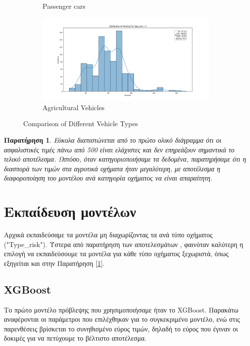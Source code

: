 \documentclass{llncs}
\newtheorem{observation}{Παρατήρηση}
\begin{document}
\begin{figure}[h!]
\begin{subfigure}{0.45\linewidth}
       \caption{Passenger cars}
       \label{fig:subfig3}
        \end{subfigure}
         \begin{subfigure}{0.45\linewidth}
        \includegraphics[width=\linewidth]{images/premium_risk4.png}
        \caption{Agricultural Vehicles}
        \label{fig:subfig4}
         \end{subfigure}
  \caption{Comparison of Different Vehicle Types}
  \label{fig:subfigures4}
\end{figure}


\begin{observation}
    \label{observation:first}
    Εύκολα διαπιστώνεται από το πρώτο ολικό διάγραμμα ότι οι ασφαλιστικές τιμές πάνω από 500 είναι ελάχιστες και δεν επηρεάζουν σημαντικά το τελικό αποτέλεσμα. Ωστόσο, όταν κατηγοριοποιήσαμε τα δεδομένα, παρατηρήσαμε ότι η διασπορά των τιμών στα αγροτικά οχήματα ήταν μεγαλύτερη, με αποτέλεσμα η διαφοροποίηση του μοντέλου ανά κατηγορία οχήματος να είναι απαραίτητη.
\end{observation}

\section{Εκπαίδευση μοντέλων}
Αρχικά εκπαιδεύσαμε τα μοντέλα μη διαχωρίζοντας τα ανά τύπο οχήματος ("Type\_risk"). Ύστερα από παρατήρηση των αποτελεσμάτων , φαινόταν καλύτερη η επιλογή να εκπαιδεύσουμε τα μοντέλα για κάθε τύπο οχήματος ξεχωριστά, όπως εξηγείται και στην Παρατήρηση [\ref{observation:first}].

\subsection{XGBoost}
Το πρώτο μοντέλο πρόβλεψης που χρησιμοποιήσαμε ήταν το XGBoost. Παρακάτω αναφέρονται οι παράμετροι που επιλέχθηκαν για το συγκεκριμένο μοντέλο, ενώ στις παρενθέσεις βρίσκεται το συνηθισμένο εύρος τιμών, δηλαδή το εύρος που έγιναν οι δοκιμές για να πετύχουμε το βέλτιστο αποτέλεσμα.\\
\end{document}
